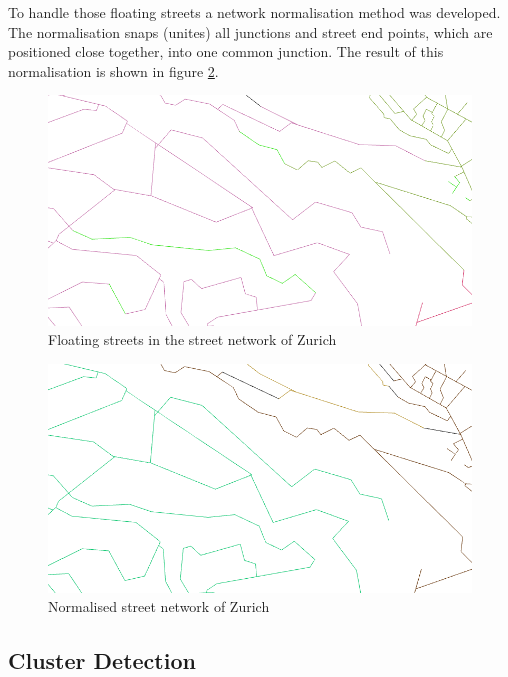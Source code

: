 \documentclass[11pt, a4paper]{report}
\begin{document}
To handle those floating streets a network normalisation method was developed. The normalisation snaps (unites) all junctions and street end points, which are positioned close together, into one common junction. The result of this normalisation is shown in figure \ref{fig:zuerich_fixed}.

\begin{figure}[!h]
\begin{mdframed}[style=mdthight]
    \centering
    \includegraphics[width=\textwidth]{zuerich_street_error_cropped.png}
\end{mdframed}
    \caption{Floating streets in the street network of Zurich\label{fig:zuerich_error}}
\end{figure}

\begin{figure}[!h]
\begin{mdframed}[style=mdthight]
    \centering
    \includegraphics[width=\textwidth]{zuerich_street_fixed_cropped.png}
\end{mdframed}
    \caption{Normalised street network of Zurich\label{fig:zuerich_fixed}}
\end{figure}
\subsection{Cluster Detection}
\end{document}
